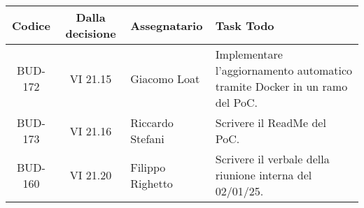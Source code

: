 \clearpage
\vspace*{-2cm} 
\begin{table}[t]
    \centering
    \begin{tabular}{|c|c|p{}|p{}|}
        \hline
        \rowcolor[gray]{0.75}
        \textbf{Codice} & \textbf{Dalla decisione} & \textbf{Assegnatario} & \textbf{Task Todo} \\
        \hline
        BUD-172 & VI 21.15 & Giacomo Loat& Implementare l'aggiornamento automatico tramite Docker in un ramo del PoC. \\
        \hline
        BUD-173 & VI 21.16 & Riccardo Stefani & Scrivere il ReadMe del PoC. \\
        \hline
        BUD-160 & VI 21.20 & Filippo Righetto & Scrivere il verbale della riunione interna del 02/01/25. \\
        \hline
    \end{tabular}
\end{table}